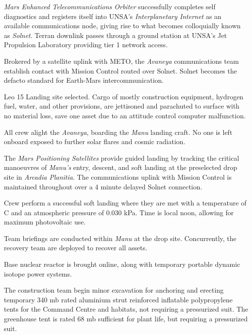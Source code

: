 {\it Mars Enhanced Telecommunications Orbiter} successfully completes self diagnostics and registers itself into UNSA's {\it Interplanetary Internet} as an available communications node, giving rise to what becomes colloquially known as {\it Solnet}. Terran downlink passes through a ground station at UNSA's Jet Propulsion Laboratory providing tier 1 network access.

Brokered by a satellite uplink with METO, the {\it Avaneya} communications team establish contact with Mission Control routed over Solnet. Solnet becomes the defacto standard for Earth-Mars intercommunication.
\StopTimelineDate

 Leo 15
Landing site selected. Cargo of mostly construction equipment, hydrogen fuel, water, and other provisions, are jettisoned and parachuted to surface with no material loss, save one asset due to an attitude control computer malfunction.
\StopTimelineDate

All crew alight the {\it Avaneya}, boarding the {\it Manu} landing craft. No one is left onboard exposed to further solar flares and cosmic radiation.

The {\it Mars Positioning Satellites} provide guided landing by tracking the critical manoeuvres of {\it Manu's} entry, descent, and soft landing at the preselected drop site in {\it Arcadia Planitia}. The communications uplink with Mission Control is maintained throughout over a 4 minute delayed Solnet connection.

Crew perform a successful soft landing where they are met with a temperature of C and an atmospheric pressure of 0.030 kPa. Time is local noon, allowing for maximum photovoltaic use.

Team briefings are conducted within {\it Manu} at the drop site. Concurrently, the recovery team are deployed to recover all assets.

Base nuclear reactor is brought online, along with temporary portable dynamic isotope power systems.

The construction team begin minor excavation for anchoring and erecting temporary 340 mb rated aluminium strut reinforced inflatable polypropylene tents for the Command Centre and habitats, not requiring a pressurized suit. The greenhouse tent is rated 68 mb sufficient for plant life, but requiring a pressurized suit.
\StopTimelineDate

